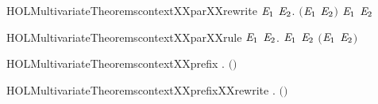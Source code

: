 \newcommand{\HOLMultivariateTheoremscontextXXpar}{\UseVerbatim{HOLMultivariateTheoremscontextXXpar}}
\begin{SaveVerbatim}{HOLMultivariateTheoremscontextXXparXXrewrite}
\HOLTokenTurnstile{} \HOLSymConst{\HOLTokenForall{}} \ensuremath{\HOLBoundVar{E}\sb{\mathrm{1}}} \ensuremath{\HOLBoundVar{E}\sb{\mathrm{2}}}.
         \ensuremath{(}\ensuremath{\HOLBoundVar{E}\sb{\mathrm{1}}} \HOLSymConst{\ensuremath{\mid}} \ensuremath{\HOLBoundVar{E}\sb{\mathrm{2}}}\ensuremath{)} \HOLSymConst{\HOLTokenEquiv{}}   \ensuremath{\HOLBoundVar{E}\sb{\mathrm{1}}} \HOLSymConst{\HOLTokenConj{}}   \ensuremath{\HOLBoundVar{E}\sb{\mathrm{2}}}
\end{SaveVerbatim}
\newcommand{\HOLMultivariateTheoremscontextXXparXXrewrite}{\UseVerbatim{HOLMultivariateTheoremscontextXXparXXrewrite}}
\begin{SaveVerbatim}{HOLMultivariateTheoremscontextXXparXXrule}
\HOLTokenTurnstile{} \HOLSymConst{\HOLTokenForall{}} \ensuremath{\HOLBoundVar{E}\sb{\mathrm{1}}} \ensuremath{\HOLBoundVar{E}\sb{\mathrm{2}}}.
         \ensuremath{\HOLBoundVar{E}\sb{\mathrm{1}}} \HOLSymConst{\HOLTokenConj{}}   \ensuremath{\HOLBoundVar{E}\sb{\mathrm{2}}} \HOLSymConst{\HOLTokenImp{}}   \ensuremath{(}\ensuremath{\HOLBoundVar{E}\sb{\mathrm{1}}} \HOLSymConst{\ensuremath{\mid}} \ensuremath{\HOLBoundVar{E}\sb{\mathrm{2}}}\ensuremath{)}
\end{SaveVerbatim}
\newcommand{\HOLMultivariateTheoremscontextXXparXXrule}{\UseVerbatim{HOLMultivariateTheoremscontextXXparXXrule}}
\begin{SaveVerbatim}{HOLMultivariateTheoremscontextXXprefix}
\HOLTokenTurnstile{} \HOLSymConst{\HOLTokenForall{}}  .   \ensuremath{(}\HOLSymConst{\ensuremath{\ldotp}}\ensuremath{)} \HOLSymConst{\HOLTokenImp{}}   
\end{SaveVerbatim}
\newcommand{\HOLMultivariateTheoremscontextXXprefix}{\UseVerbatim{HOLMultivariateTheoremscontextXXprefix}}
\begin{SaveVerbatim}{HOLMultivariateTheoremscontextXXprefixXXrewrite}
\HOLTokenTurnstile{} \HOLSymConst{\HOLTokenForall{}}  .   \ensuremath{(}\HOLSymConst{\ensuremath{\ldotp}}\ensuremath{)} \HOLSymConst{\HOLTokenEquiv{}}   
\end{SaveVerbatim}
